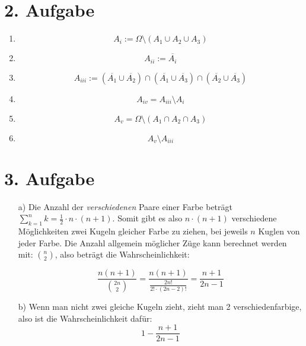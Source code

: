 \documentclass[10pt,a4paper,parskip=half]{scrartcl}
\begin{document}
\section*{2. Aufgabe}
\begin{enumerate}[\quad(i)]
	\item $$ A_i :=  \Omega \setminus (A_1 \cup A_2 \cup A_3)$$
	\item $$ A_{ii} := \overline{A_i} $$
	\item $$ A_{iii} :=  (\overline{A_1} \cup \overline{A_2}) \cap (\overline{A_1} \cup \overline{A_3}) \cap (\overline{A_2} \cup \overline{A_3}) $$
	\item $$A_{iv} = A_{iii} \setminus  A_i $$
	\item $$ A_{v} = \Omega \setminus (A_1 \cap A_2 \cap A_3) $$
	\item $$ A_v \setminus A_{iii} $$
\end{enumerate}
\section*{3. Aufgabe}
	\begin{enumerate}
		\item[a)] Die Anzahl der \textit{verschiedenen} Paare einer Farbe beträgt $\sum^n_{k=1} k = \frac12 \cdot n \cdot (n+1)$. 
		Somit gibt es also $n \cdot (n+1)$ verschiedene Möglichkeiten zwei Kugeln gleicher Farbe zu ziehen,
		bei jeweils $n$ Kuglen von jeder Farbe.
		Die Anzahl allgemein möglicher Züge kann berechnet werden mit: $\binom n2$,
		 also beträgt die Wahrscheinlichkeit:
		 
		 \[ \frac{n(n+1)}{\binom {2n}2} = \frac{n(n+1)}{\frac{2n!}{2! \cdot (2n - 2)!}} = \frac{n+1}{2n -1} \]
	\item[b)] Wenn man nicht zwei gleiche Kugeln zieht, zieht man 2 verschiedenfarbige, also ist die Wahrscheinlichkeit dafür:
	$$1 - \frac{n+1}{2n - 1} $$	
	\end{enumerate}
\end{document}
